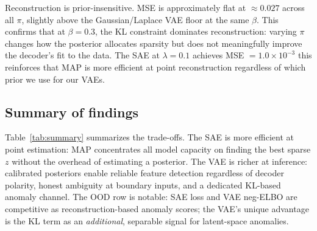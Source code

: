\documentclass{article}
\begin{document}
Reconstruction is prior-insensitive. MSE is approximately flat at $\approx 0.027$ across all $\pi$, slightly above the Gaussian/Laplace VAE floor at the same $\beta$. This confirms that at $\beta = 0.3$, the KL constraint dominates reconstruction: varying $\pi$ changes how the posterior allocates sparsity but does not meaningfully improve the decoder's fit to the data. The SAE at $\lambda = 0.1$ achieves MSE $= 1.0\times10^{-3}$ this reinforces that MAP is more efficient at point reconstruction regardless of which prior we use for our VAEs.

\subsection{Summary of findings}

\begin{table}[htbp]
  \caption{Summary: SAE vs.\ Laplace VAE across evaluation axes, with actual numbers from experiment CSVs.}
  \label{tab:summary}
  \centering
\end{table}

Table~\ref{tab:summary} summarizes the trade-offs. The SAE is more efficient at point estimation: MAP concentrates all model capacity on finding the best sparse $z$ without the overhead of estimating a posterior. The VAE is richer at inference: calibrated posteriors enable reliable feature detection regardless of decoder polarity, honest ambiguity at boundary inputs, and a dedicated KL-based anomaly channel. The OOD row is notable: SAE loss and VAE neg-ELBO are competitive as reconstruction-based anomaly scores; the VAE's unique advantage is the KL term as an \emph{additional}, separable signal for latent-space anomalies.
\end{document}
